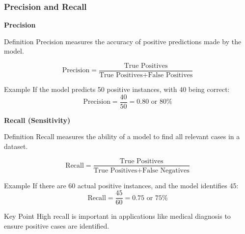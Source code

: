 \documentclass[aspectratio=169]{beamer}
\begin{document}
\begin{frame}[fragile]
    \frametitle{Precision and Recall}
    \textbf{Precision}
    \begin{block}{Definition}
    Precision measures the accuracy of positive predictions made by the model.
    \end{block}
    \begin{equation}
        \text{Precision} = \frac{\text{True Positives}}{\text{True Positives} + \text{False Positives}}
    \end{equation}
    \begin{block}{Example}
    If the model predicts 50 positive instances, with 40 being correct:
    \begin{equation}
        \text{Precision} = \frac{40}{50} = 0.80 \text{ or } 80\%
    \end{equation}
    \end{block}
    
    \textbf{Recall (Sensitivity)}
    \begin{block}{Definition}
    Recall measures the ability of a model to find all relevant cases in a dataset.
    \end{block}
    \begin{equation}
        \text{Recall} = \frac{\text{True Positives}}{\text{True Positives} + \text{False Negatives}}
    \end{equation}
    \begin{block}{Example}
    If there are 60 actual positive instances, and the model identifies 45:
    \begin{equation}
        \text{Recall} = \frac{45}{60} = 0.75 \text{ or } 75\%
    \end{equation}
    \end{block}
    
    \begin{block}{Key Point}
    High recall is important in applications like medical diagnosis to ensure positive cases are identified.
    \end{block}
\end{frame}
\end{document}
